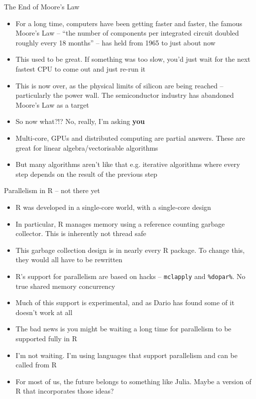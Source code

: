 \documentclass{beamer}
\begin{document}
\begin{frame}{The End of Moore's Law}
\begin{itemize}
\item For a long time, computers have been getting faster and faster, the famous
			Moore's Law -- ``the number of components per integrated circuit doubled roughly every 18 months'' -- 
			has held from 1965 to just about now
\item This used to be great. If something was too slow, you'd just wait for the next fastest CPU to come out
			and just re-run it
\item This is now over, as the physical limits of silicon are being reached -- particularly the power wall. 
			The semiconductor industry has abandoned Moore's Law as a target
\item So now what?!? No, really, I'm asking \textbf{you}
\item Multi-core, GPUs and distributed computing are partial answers. These are great for
			linear algebra/vectorisable algorithms
\item But many algorithms aren't like that e.g. iterative algorithms where every step depends on the 
			result of the previous step
\end{itemize}
\end{frame}

\begin{frame}{Parallelism in R -- not there yet}
\begin{itemize}
\item R was developed in a single-core world, with a single-core design
\item In particular, R manages memory using a reference counting garbage collector. This is inherently
			not thread safe
\item This garbage collection design is in nearly every R package. To change this, they would all have to
			be rewritten
\item R's support for parallelism are based on hacks -- \texttt{mclapply} and \texttt{\%dopar\%}. No true 
			shared memory concurrency
\item Much of this	support is experimental, and as Dario has found some of it doesn't work at all
\item The bad news is you might be waiting a long time for parallelism to be supported fully in R
\item I'm not waiting. I'm using languages that support parallelism and can be called from R
\item For most of us, the future belongs to something like Julia. Maybe a version of R that incorporates
			those ideas?
\end{itemize}
\end{frame}
\end{document}
